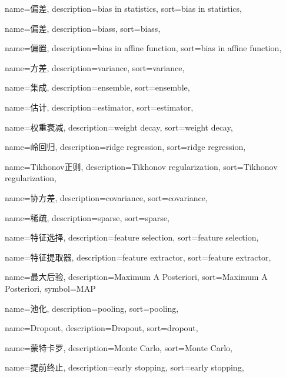 {
  name=偏差,
  description={bias in statistics},
  sort={bias in statistics},
}

{
  name=偏差,
  description={biass},
  sort={biass},
}

{
  name=偏置,
  description={bias in affine function},
  sort={bias in affine function},
}

{
  name=方差,
  description={variance},
  sort={variance},
}

{
  name=集成,
  description={ensemble},
  sort={ensemble},
}

{
  name=估计,
  description={estimator},
  sort={estimator},
}

{
  name=权重衰减,
  description={weight decay},
  sort={weight decay},
}

{
  name=岭回归,
  description={ridge regression},
  sort={ridge regression},
}

{
  name=Tikhonov正则,
  description={Tikhonov regularization},
  sort={Tikhonov regularization},
}

{
  name=协方差,
  description={covariance},
  sort={covariance},
}

{
  name=稀疏,
  description={sparse},
  sort={sparse},
}

{
  name=特征选择,
  description={feature selection},
  sort={feature selection},
}

{
  name=特征提取器,
  description={feature extractor},
  sort={feature extractor},
}

{
  name=最大后验,
  description={Maximum A Posteriori},
  sort={Maximum A Posteriori},
  symbol={MAP}
}

{
  name=池化,
  description={pooling},
  sort={pooling},
}

{
  name=Dropout,
  description={Dropout},
  sort={dropout},
}

{
  name=蒙特卡罗,
  description={Monte Carlo},
  sort={Monte Carlo},
}

{
  name=提前终止,
  description={early stopping},
  sort={early stopping},
}

